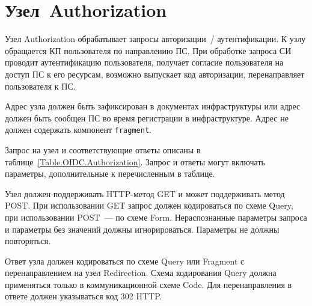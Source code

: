 \section{Узел~Authorization}\label{OIDC.Authorization}

Узел Authorization обрабатывает запросы авторизации~/ аутентификации. 
%
К узлу обращается КП пользователя по направлению ПС.
%
При обработке запроса СИ проводит аутентификацию пользователя, получает 
согласие пользователя на доступ ПС к его ресурсам, возможно выпускает код 
авторизации, перенаправляет пользователя к ПС. 

Адрес узла должен быть зафиксирован в документах инфраструктуры
или адрес должен быть сообщен ПС во время регистрации в инфраструктуре.
%
Адрес не должен содержать компонент \lstinline{fragment}.

Запрос на узел и соответствующие ответы описаны в 
таблице~\ref{Table.OIDC.Authorization}.
%
Запрос и ответы могут включать параметры, дополнительные к перечисленным в 
таблице. 

Узел должен поддерживать HTTP-метод GET и может поддерживать метод POST. 
%
При использовании GET запрос должен кодироваться по схеме Query,
при использовании POST~--- по схеме Form.
%
Нераспознанные параметры запроса и параметры без значений должны 
игнорироваться.
%
Параметры не должны повторяться.

Ответ узла должен кодироваться по схеме Query или Fragment с перенаправлением 
на узел Redirection. 
%
Схема кодирования Query должна применяться только в коммуникационной схеме Code.
%
Для перенаправления в ответе должен указываться код 302 HTTP.

